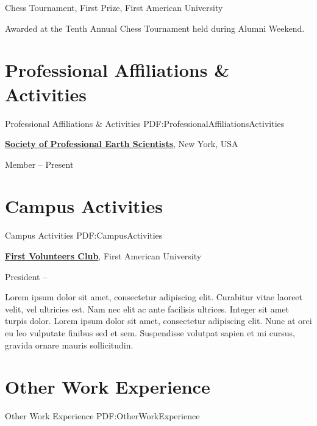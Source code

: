 \documentclass[a4paper,10pt,oneside]{article}
\begin{document}
\begin{body}
Chess Tournament,
First Prize,
First American University
\hfill
{}
\begin{detail}
Awarded at the Tenth Annual Chess Tournament held during Alumni Weekend.
\end{detail}


\section
{Professional Affiliations\newline
\& Activities}
{Professional Affiliations \& Activities}
{PDF:ProfessionalAffiliationsActivities}

\href{http://www.example.com/my-society}
{\textbf{Society of Professional Earth Scientists}},
New York, USA
\par
Member
\hfill
{} --
Present


\section
{Campus Activities}
{Campus Activities}
{PDF:CampusActivities}

\href{http://www.example.com/my-club}
{\textbf{First Volunteers Club}},
First American University
\par
President
\hfill
{} --
\begin{detail}
\BulletItem
Lorem ipsum dolor sit amet, consectetur adipiscing elit.
\BulletItem
Curabitur vitae laoreet velit, vel ultricies est. Nam nec elit ac ante facilisis ultrices.
\BulletItem
Integer sit amet turpis dolor. Lorem ipsum dolor sit amet, consectetur adipiscing elit. Nunc at orci eu leo vulputate finibus sed et sem.
\BulletItem
Suspendisse volutpat sapien et mi cursus, gravida ornare mauris sollicitudin.
\end{detail}


\section
{Other Work\newline
Experience}
{Other Work Experience}
{PDF:OtherWorkExperience}


\end{body}
\end{document}
